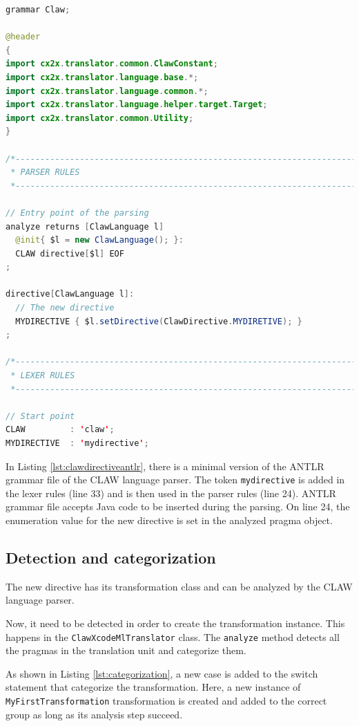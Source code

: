 \documentclass[a4paper, 11pt]{report}
\begin{document}
\begin{lstlisting}[label=lst:clawdirectiveantlr, caption=Claw.g4, language=java]
grammar Claw;

@header
{
import cx2x.translator.common.ClawConstant;
import cx2x.translator.language.base.*;
import cx2x.translator.language.common.*;
import cx2x.translator.language.helper.target.Target;
import cx2x.translator.common.Utility;
}

/*----------------------------------------------------------------------------
 * PARSER RULES
 *----------------------------------------------------------------------------*/
 
// Entry point of the parsing
analyze returns [ClawLanguage l]
  @init{ $l = new ClawLanguage(); }:
  CLAW directive[$l] EOF
;     
 
directive[ClawLanguage l]:
  // The new directive
  MYDIRECTIVE { $l.setDirective(ClawDirective.MYDIRETIVE); }
;

/*----------------------------------------------------------------------------
 * LEXER RULES
 *----------------------------------------------------------------------------*/

// Start point
CLAW         : 'claw';
MYDIRECTIVE  : 'mydirective';
\end{lstlisting}

In Listing \ref{lst:clawdirectiveantlr}, there is a minimal version of the 
ANTLR grammar file of the CLAW language parser. The token 
\lstinline|mydirective| is added in the lexer rules (line 33) and is then 
used in the parser rules (line 24). ANTLR grammar file accepts Java code
to be inserted during the parsing. On line 24, the enumeration value for 
the new directive is set in the analyzed pragma object. 

\subsection{Detection and categorization}
The new directive has its transformation class and can be analyzed by the 
CLAW language parser. 

Now, it need to be detected in order to create the transformation instance. 
This happens in the \lstinline|ClawXcodeMlTranslator| class. The 
\lstinline|analyze| method detects all the pragmas in the translation unit
and categorize them. 

As shown in Listing \ref{lst:categorization}, a new case is added to the switch
statement that categorize the transformation. Here, a new instance of 
\lstinline|MyFirstTransformation| transformation is created and added to the
correct group as long as its analysis step succeed.
\end{document}
